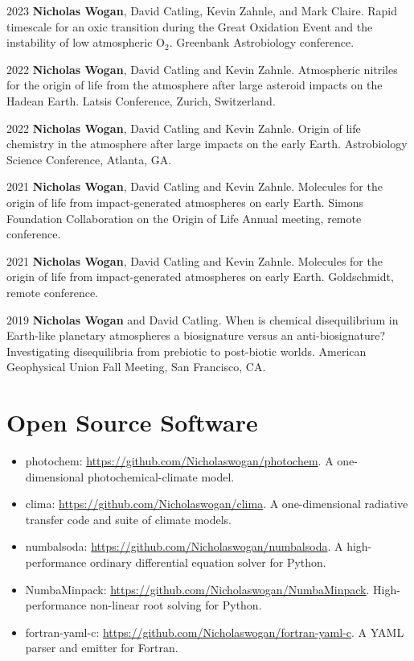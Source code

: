 \documentclass{article}
\begin{document}
\begin{cvlist}
\item[2023]
  \textbf{Nicholas Wogan}, David Catling, Kevin Zahnle, and Mark Claire. Rapid timescale for an oxic transition during the Great Oxidation Event and the instability of low atmospheric O$_2$. Greenbank Astrobiology conference.
\item[2022]
  \textbf{Nicholas Wogan}, David Catling and Kevin Zahnle. Atmospheric nitriles for the origin of life from the atmosphere after large asteroid impacts on the Hadean Earth. Latsis Conference, Zurich, Switzerland.
\item[2022]
  \textbf{Nicholas Wogan}, David Catling and Kevin Zahnle. Origin of life chemistry in the atmosphere after large impacts on the early Earth. Astrobiology Science Conference, Atlanta, GA.
\item[2021]
  \textbf{Nicholas Wogan}, David Catling and Kevin Zahnle. Molecules for the origin of life from impact-generated atmospheres on early Earth. Simons Foundation Collaboration on the Origin of Life Annual meeting, remote conference.
\item[2021]
  \textbf{Nicholas Wogan}, David Catling and Kevin Zahnle. Molecules for the origin of life from impact-generated atmospheres on early Earth. Goldschmidt, remote conference.
\item[2019]
  \textbf{Nicholas Wogan} and David Catling. When is chemical disequilibrium in Earth-like planetary atmospheres a biosignature versus an anti-biosignature? Investigating disequilibria from prebiotic to post-biotic worlds. American Geophysical Union Fall Meeting, San Francisco, CA.
\end{cvlist}

\section{Open Source Software}

\begin{itemize}
  \item photochem: \url{https://github.com/Nicholaswogan/photochem}. A one-dimensional photochemical-climate model.
  \item clima: \url{https://github.com/Nicholaswogan/clima}. A one-dimensional radiative transfer code and suite of climate models. 
  \item numbalsoda: \url{https://github.com/Nicholaswogan/numbalsoda}. A high-performance ordinary differential equation solver for Python.
  \item NumbaMinpack: \url{https://github.com/Nicholaswogan/NumbaMinpack}. High-performance non-linear root solving for Python.
  \item fortran-yaml-c: \url{https://github.com/Nicholaswogan/fortran-yaml-c}. A YAML parser and emitter for Fortran.
\end{itemize}
\end{document}
